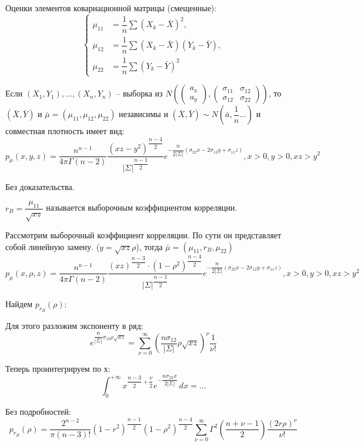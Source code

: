 Оценки элементов ковариационной матрицы (смещенные):
\[
\begin{cases}
  \mu_{11} &= \dfrac{1}{n} \sum (X_k - \bar X)^2, \\
  \mu_{12} &= \dfrac{1}{n} \sum (X_k - \bar X)(Y_k - \bar Y), \\ 
  \mu_{22} &= \dfrac{1}{n} \sum (Y_k - \bar Y)^2
\end{cases}
\]

\begin{theorem}[Фишера]
  Если $(X_1,Y_1), \dots, (X_n, Y_n)$ -- выборка из 
  $N(
    \begin{pmatrix} a_x \\ a_y \end{pmatrix},
    \begin{pmatrix}
      \sigma_{11} & \sigma_{12} \\
      \sigma_{12} & \sigma_{22}
    \end{pmatrix} )$,
  то $(\bar X, \bar Y)$ и $\bar \mu = (\mu_{11}, \mu_{12}, \mu_{22})$ независимы и
  $(\bar X, \bar Y) \sim N( \bar a, \dfrac{1}{n} \dots )$
  и совместная плотность имеет вид:
  \[
    p_{\mu} (x, y, z) = \dfrac{n^{n-1}}{4\pi \Gamma(n-2)} \dfrac{(xz - y^2)^\dfrac{n-4}{2}}{|\Sigma|^\dfrac{n-1}{2}} e^{-\dfrac{n}{2 |\Sigma|} (\sigma_{22} x - 2 \sigma_{12}y + \sigma_{11} z) }, x>0, y>0, xz>y^2
  \]
\end{theorem}
Без доказательства.

\begin{definition}
  $r_B = \dfrac{\mu_{11}}{\sqrt{xz}}$ называется выборочным коэффициентом корреляции.
\end{definition}

\begin{corollary}
  Рассмотрим выборочный коэффициент корреляции. По сути он представляет собой линейную замену.
  ($y = \sqrt{xz} \rho$),
  тогда $\bar \mu = (\mu_{11}, r_B, \mu_{22})$
  \[
    p_\mu (x, \rho, z) = 
    \dfrac{n^{n-1}}{4\pi \Gamma(n-2)}
    \dfrac{(xz)^\dfrac{n-3}{2} \cdot (1-\rho^2)^\dfrac{n-4}{2}}{|\Sigma|^\dfrac{n-1}{2}}
    e^{-\dfrac{n}{2 |\Sigma|} (\sigma_{22} x - 2 \sigma_{12}y + \sigma_{11} z) }, x>0, y>0, xz>y^2
  \]

  Найдем $p_{r_B} (\rho)$:

  Для этого разложим экспоненту в ряд:
  \[
    e^{ \dfrac{n}{|\Sigma|} \sigma_{12} \rho \sqrt{xz} }
    = \sum_{\nu=0}^\infty \left(\dfrac{n \sigma_{12}}{|\Sigma|} \rho \sqrt{xz} \right)^\nu \dfrac{1}{\nu!}
  \]

  Теперь проинтегрируем по х:
  \[
    \int_0^{+\infty} x^{\dfrac{n-3}{2} + \dfrac{\nu}{2}} e^{-\dfrac{n \sigma_{22} x}{2 |\Sigma|}} \, dx = \dots %
  \]

  Без подробностей:
  \[
    p_{r_B} (\rho) = \dfrac{2^{n-2}}{\pi (n-3)!}
    (1 - r^2)^{\dfrac{n-1}{2}}
    (1-\rho^2)^{\dfrac{n-4}{2}}
    \sum_{\nu=0}^\infty \Gamma^2\left(\dfrac{n+\nu-1}{2}\right) \dfrac{(2 r \rho)^\nu}{\nu!}
  \]
\end{corollary}

